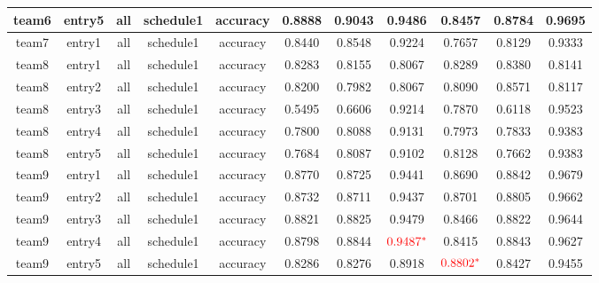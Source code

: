 \begin{footnotesize}
\begin{tabular}{c|c|c|c|c|c|c|c|c|c|c}
team6&entry5&all&schedule1&accuracy&0.8888&0.9043&0.9486&0.8457&0.8784&0.9695\\\hline
team7&entry1&all&schedule1&accuracy&0.8440&0.8548&0.9224&0.7657&0.8129&0.9333\\\hline
team8&entry1&all&schedule1&accuracy&0.8283&0.8155&0.8067&0.8289&0.8380&0.8141\\
team8&entry2&all&schedule1&accuracy&0.8200&0.7982&0.8067&0.8090&0.8571&0.8117\\
team8&entry3&all&schedule1&accuracy&0.5495&0.6606&0.9214&0.7870&0.6118&0.9523\\
team8&entry4&all&schedule1&accuracy&0.7800&0.8088&0.9131&0.7973&0.7833&0.9383\\
team8&entry5&all&schedule1&accuracy&0.7684&0.8087&0.9102&0.8128&0.7662&0.9383\\\hline
team9&entry1&all&schedule1&accuracy&0.8770&0.8725&0.9441&0.8690&0.8842&0.9679\\
team9&entry2&all&schedule1&accuracy&0.8732&0.8711&0.9437&0.8701&0.8805&0.9662\\
team9&entry3&all&schedule1&accuracy&0.8821&0.8825&0.9479&0.8466&0.8822&0.9644\\
team9&entry4&all&schedule1&accuracy&0.8798&0.8844&{$\color{red}0.9487^*$}&0.8415&0.8843&0.9627\\
team9&entry5&all&schedule1&accuracy&0.8286&0.8276&0.8918&{$\color{red}0.8802^*$}&0.8427&0.9455\\
\end{tabular}
\end{footnotesize}